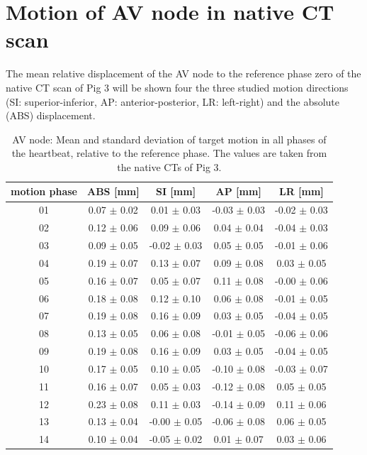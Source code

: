 \documentclass[type=dr, dr=rernat, accentcolor=tud7b,colorbacktitle, bigchapter, openright, twoside, 12pt ]{tudthesis}
\begin{document}
\newpage

\section{Motion of AV node in native CT scan}

The mean relative displacement of the AV node to the reference phase zero of the native CT scan of Pig 3 will be shown four the three studied 
motion directions (SI: superior-inferior, AP: anterior-posterior, LR: left-right) and the absolute (ABS) displacement.

\begin{table}[H]
  \centering
  \scriptsize
  \caption{AV node: Mean and standard deviation of target motion in all phases of the heartbeat, relative to the reference phase. The values are 
  taken from the native CTs of Pig 3.}
  \begin{tabular}{|c|c|c|c|c|}
    \hline\hline
    motion phase\rule{0pt}{2.6ex}\rule[-1.2ex]{0pt}{0pt} & ABS [mm] & SI [mm] & AP [mm] & LR [mm]\\
    \hline
01&0.07 $\pm$ 0.02 &0.01 $\pm$ 0.03 &-0.03 $\pm$ 0.03 &-0.02 $\pm$ 0.03 \\
02&0.12 $\pm$ 0.06 &0.09 $\pm$ 0.06 &0.04 $\pm$ 0.04 &-0.04 $\pm$ 0.03 \\
03&0.09 $\pm$ 0.05 &-0.02 $\pm$ 0.03 &0.05 $\pm$ 0.05 &-0.01 $\pm$ 0.06 \\
04&0.19 $\pm$ 0.07 &0.13 $\pm$ 0.07 &0.09 $\pm$ 0.08 &0.03 $\pm$ 0.05 \\
05&0.16 $\pm$ 0.07 &0.05 $\pm$ 0.07 &0.11 $\pm$ 0.08 &-0.00 $\pm$ 0.06 \\
06&0.18 $\pm$ 0.08 &0.12 $\pm$ 0.10 &0.06 $\pm$ 0.08 &-0.01 $\pm$ 0.05 \\
07&0.19 $\pm$ 0.08 &0.16 $\pm$ 0.09 &0.03 $\pm$ 0.05 &-0.04 $\pm$ 0.05 \\
08&0.13 $\pm$ 0.05 &0.06 $\pm$ 0.08 &-0.01 $\pm$ 0.05 &-0.06 $\pm$ 0.06 \\
09&0.19 $\pm$ 0.08 &0.16 $\pm$ 0.09 &0.03 $\pm$ 0.05 &-0.04 $\pm$ 0.05 \\
10&0.17 $\pm$ 0.05 &0.10 $\pm$ 0.05 &-0.10 $\pm$ 0.08 &-0.03 $\pm$ 0.07 \\
11&0.16 $\pm$ 0.07 &0.05 $\pm$ 0.03 &-0.12 $\pm$ 0.08 &0.05 $\pm$ 0.05 \\
12&0.23 $\pm$ 0.08 &0.11 $\pm$ 0.03 &-0.14 $\pm$ 0.09 &0.11 $\pm$ 0.06 \\
13&0.13 $\pm$ 0.04 &-0.00 $\pm$ 0.05 &-0.06 $\pm$ 0.08 &0.06 $\pm$ 0.05 \\
14&0.10 $\pm$ 0.04 &-0.05 $\pm$ 0.02 &0.01 $\pm$ 0.07 &0.03 $\pm$ 0.06 \\

\end{tabular}
\end{table}
\end{document}
